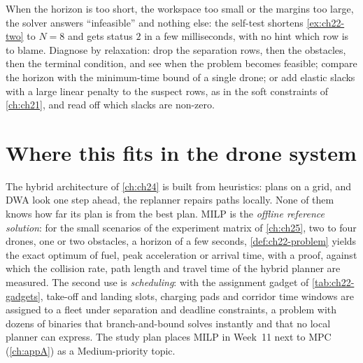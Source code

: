 \begin{pitfall}
When the horizon is too short, the workspace too small or the margins too
large, the solver answers ``infeasible'' and nothing else: the self-test
shortens \cref{ex:ch22-two} to $N = 8$ and gets status $2$ in a few
milliseconds, with no hint which row is to blame. Diagnose by relaxation:
drop the separation rows, then the obstacles, then the terminal condition,
and see when the problem becomes feasible; compare the horizon with the
minimum-time bound of a single drone; or add elastic slacks with a large
linear penalty to the suspect rows, as in the soft constraints of
\cref{ch:ch21}, and read off which slacks are non-zero.
\end{pitfall}

\section{Where this fits in the drone system}
\label{sec:ch22-drone}

\begin{dronebox}
The hybrid architecture of \cref{ch:ch24} is built from heuristics: \cbs
plans on a grid, \orca and DWA look one step ahead, the replanner repairs
paths locally. None of them knows how far its plan is from the best plan.
MILP is the \emph{offline reference solution}: for the small scenarios of
the experiment matrix of \cref{ch:ch25}, two to four drones, one or two
obstacles, a horizon of a few seconds, \cref{def:ch22-problem} yields the
exact optimum of fuel, peak acceleration or arrival time, with a proof,
against which the collision rate, path length and travel time of the
hybrid planner are measured. The second use is \emph{scheduling}: with the
assignment gadget of \cref{tab:ch22-gadgets}, take-off and landing slots,
charging pads and corridor time windows are assigned to a fleet under
separation and deadline constraints, a problem with dozens of binaries
that branch-and-bound solves instantly and that no local planner can
express. The study plan places MILP in Week~11 next to MPC
(\cref{ch:appA}) as a Medium-priority topic.
\end{dronebox}

